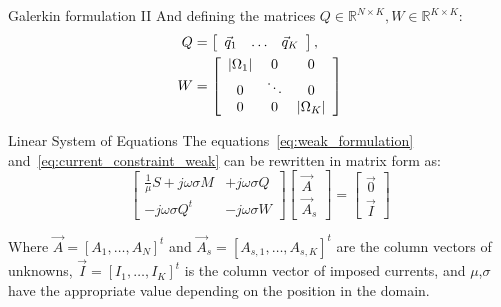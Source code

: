 \documentclass[aspectratio=54,xcolor=dvipsnames]{beamer}
\begin{document}
\begin{frame}{Galerkin formulation II}
    And defining the matrices $Q \in \mathbb{R}^{N \times K}, W \in \mathbb{R}^{K \times K}$:
    \begin{align*}
        Q &= \left[
        \begin{array}{ccc}
            \vec{q}_1 & \ldots & \vec{q}_K 
        \end{array}
        \right], \\
        W &= \left[
        \begin{array}{ccc}
            \abs{\Omega_1} & 0 & 0 \\
            0 & \ddots & 0 \\
            0 & 0 & \abs{\Omega_K}
        \end{array}
        \right]
    \end{align*}

    \begin{block}{Linear System of Equations}
    The equations~\eqref{eq:weak_formulation} and~\eqref{eq:current_constraint_weak} can be rewritten in matrix form as:
    \begin{equation}
        \left[
        \begin{array}{cc}
            \frac{1}{\mu} S + j\omega \sigma M & +j\omega \sigma Q\\
            -j\omega \sigma Q^t & -j\omega \sigma W 
        \end{array}
        \right]
        \left[
        \begin{array}{c}
            \vec{A} \\
            \vec{A}_{s}
        \end{array}
        \right]
        =
        \left[
        \begin{array}{c}
            \vec{0} \\
            \vec{I} 
        \end{array}
        \right]
    \end{equation}
    \end{block}
    Where $\vec{A} = [A_1, \ldots, A_N]^t$ and $\vec{A}_s = [A_{s,1}, \ldots, A_{s,K}]^t$ are the column vectors of unknowns, $\vec{I} = [I_1, \ldots, I_K]^t$ is the column vector of imposed currents, and $\mu$,$\sigma$ have the appropriate value depending on the position in the domain.
\end{frame}
\end{document}

